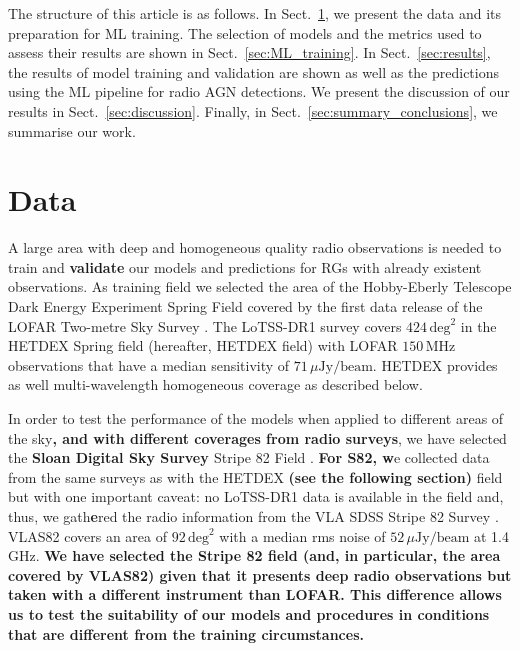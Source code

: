 \documentclass{aa}
\begin{document}
The structure of this article is as follows. In Sect.~\ref{sec:data}, we present the data and its preparation for ML training. The selection of models and the metrics used to assess their results are shown in Sect.~\ref{sec:ML_training}. In Sect.~\ref{sec:results}, the results of model training and validation are shown as well as the predictions using the ML pipeline for radio AGN detections. We present the discussion of our results in Sect.~\ref{sec:discussion}. Finally, in Sect.~\ref{sec:summary_conclusions}, we summarise our work.

\section{Data}\label{sec:data}

A large area with deep and homogeneous quality radio observations is needed to train and \textbf{validate} our models and predictions for RGs with already existent observations. As training field we selected the area of the Hobby-Eberly Telescope Dark Energy Experiment Spring Field \citep[HETDEX;][]{2008ASPC..399..115H} covered by the first data release of the LOFAR Two-metre Sky Survey \citep[LoTSS-DR1;][]{2019A&A...622A...1S}. The LoTSS-DR1 survey covers $424\, \mathrm{deg}^{2}$ in the HETDEX Spring field (hereafter, HETDEX field) with LOFAR \citep{2013A&A...556A...2V} $150\, \mathrm{MHz}$ observations that have a median sensitivity of $71\, \mu\mathrm{Jy}/\mathrm{beam}$. HETDEX provides as well multi-wavelength homogeneous coverage as described below.

In order to test the performance of the models when applied to different areas of the sky\textbf{, and with different coverages from radio surveys}, we have selected the \textbf{Sloan Digital Sky Survey \citep[SDSS,][]{2000AJ....120.1579Y}} Stripe 82 Field \textbf{\citep[S82,][]{2014ApJ...794..120A, 2014ApJS..213...12J}}. \textbf{For S82, w}e collected data from the same surveys as with the HETDEX \textbf{(see the following section)} field but with one important caveat: no LoTSS-DR1 data is available in the field and, thus, we gath\textbf{e}red the radio information from the VLA SDSS Stripe 82 Survey \citep[VLAS82;][]{2011AJ....142....3H}. VLAS82 covers an area of $92\, \mathrm{deg}^{2}$ with a median rms noise of $52\,\mu\mathrm{Jy}/\mathrm{beam}$ at 1.4$\,$GHz. \textbf{We have selected the Stripe 82 field (and, in particular, the area covered by VLAS82) given that it presents deep radio observations but taken with a different instrument than LOFAR. This difference allows us to test the suitability of our models and procedures in conditions that are different from the training circumstances.}
\end{document}
